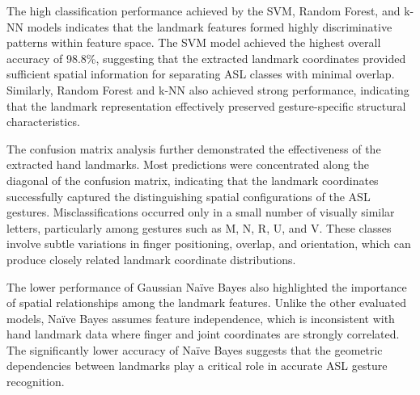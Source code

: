 The high classification performance achieved by the SVM, Random Forest, and k-NN models indicates that the landmark features formed highly discriminative patterns within feature space. The SVM model achieved the highest overall accuracy of 98.8\%, suggesting that the extracted landmark coordinates provided sufficient spatial information for separating ASL classes with minimal overlap. Similarly, Random Forest and k-NN also achieved strong performance, indicating that the landmark representation effectively preserved gesture-specific structural characteristics.

The confusion matrix analysis further demonstrated the effectiveness of the extracted hand landmarks. Most predictions were concentrated along the diagonal of the confusion matrix, indicating that the landmark coordinates successfully captured the distinguishing spatial configurations of the ASL gestures. Misclassifications occurred only in a small number of visually similar letters, particularly among gestures such as M, N, R, U, and V. These classes involve subtle variations in finger positioning, overlap, and orientation, which can produce closely related landmark coordinate distributions.

The lower performance of Gaussian Naïve Bayes also highlighted the importance of spatial relationships among the landmark features. Unlike the other evaluated models, Naïve Bayes assumes feature independence, which is inconsistent with hand landmark data where finger and joint coordinates are strongly correlated. The significantly lower accuracy of Naïve Bayes suggests that the geometric dependencies between landmarks play a critical role in accurate ASL gesture recognition.